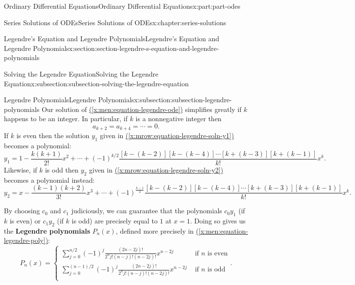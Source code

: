 \documentclass[oneside,10pt,]{book}
\newcommand{\xreffont}{\relax}
\newcommand{\terminology}[1]{\textbf{#1}}
\numberwithin{equation}{part}
\newcommand{\amp}{&}
\begin{document}
\begin{partptx}{Ordinary Differential Equations}{}{Ordinary Differential Equations}{}{}{x:part:part-odes}
\begin{chapterptx}{Series Solutions of ODEs}{}{Series Solutions of ODEs}{}{}{x:chapter:series-solutions}
\begin{sectionptx}{Legendre's Equation and Legendre Polynomials}{}{Legendre's Equation and Legendre Polynomials}{}{}{x:section:section-legendre-s-equation-and-legendre-polynomials}
\begin{subsectionptx}{Solving the Legendre Equation}{}{Solving the Legendre Equation}{}{}{x:subsection:subsection-solving-the-legendre-equation}
\end{subsectionptx}
%
%
\typeout{************************************************}
\typeout{************************************************}
%
\begin{subsectionptx}{Legendre Polynomials}{}{Legendre Polynomials}{}{}{x:subsection:subsection-legendre-polynomials}
Our solution of \hyperref[x:men:equation-legendre-ode]{({\xreffont\ref{x:men:equation-legendre-ode}})} simplifies greatly if \(k\) happens to be an integer. In particular, if \(k\) is a nonnegative integer then%
\begin{equation*}
a_{k+2} = a_{k+4} = \cdots = 0\text{.}
\end{equation*}
If \(k\) is even then the solution \(y_{1}\) given in \hyperref[x:mrow:equation-legendre-soln-y1]{({\xreffont\ref{x:mrow:equation-legendre-soln-y1}})} becomes a polynomial:%
\begin{equation*}
y_{1} = 1 - \frac{k(k+1)}{2!}x^{2} + \cdots + (-1)^{k/2}\frac{[k - (k-2)][k - (k-4)]\cdots[k + (k-3)][k + (k-1)]}{k!}x^{k}\text{.}
\end{equation*}
Likewise, if \(k\) is odd then \(y_{2}\) given in \hyperref[x:mrow:equation-legendre-soln-y2]{({\xreffont\ref{x:mrow:equation-legendre-soln-y2}})} becomes a polynomial instead:%
\begin{equation*}
y_{2} = x - \frac{(k-1)(k+2)}{3!}x^{3} + \cdots + (-1)^{\frac{k-1}{2}}\frac{[k - (k - 2)][k - (k - 4)]\cdots[k + (k - 3)][k + (k - 1)]}{k!}x^{k}\text{.}
\end{equation*}
%
\par
By choosing \(c_{0}\) and \(c_{1}\) judiciously, we can guarantee that the polynomials \(c_{0}y_{1}\) (if \(k\) is even) or \(c_{1}y_{2}\) (if \(k\) is odd) are precisely equal to \(1\) at \(x = 1\). Doing so gives us the \terminology{Legendre polynomials} \(P_{n}(x)\), defined more precisely in \hyperref[x:men:equation-legendre-poly]{({\xreffont\ref{x:men:equation-legendre-poly}})}:%
\begin{equation}
P_{n}(x) = \begin{cases} \sum_{j = 0}^{n/2}(-1)^{j}\frac{(2n - 2j)!}{2^{n}j!(n - j)!(n - 2j)!}x^{n - 2j} \amp \text{ if }n\text{ is even} \\
\sum_{j = 0}^{(n-1)/2}(-1)^{j}\frac{(2n - 2j)!}{2^{n}j!(n - j)!(n - 2j)!}x^{n - 2j} \amp \text{ if }n\text{ is odd} \\ \end{cases}\text{.}\label{x:men:equation-legendre-poly}
\end{equation}

\end{subsectionptx}
\end{sectionptx}
\end{chapterptx}
\end{partptx}
\end{document}
